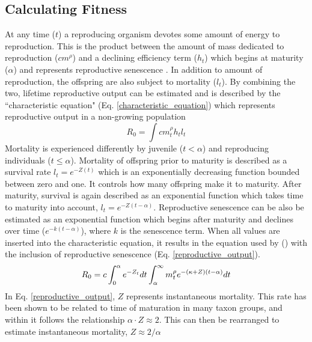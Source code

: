 \documentclass[a4paper, 11pt, hidelinks]{article} %
\begin{document}
	\subsection{Calculating Fitness}
	At any time ($ t $) a reproducing organism devotes some amount of energy to reproduction.  This is the product between the amount of mass dedicated to reproduction ($ cm^\rho $) and a declining efficiency term ($ h_t $) which begins at maturity ($ \alpha $) and represents reproductive senescence \parencite{Benoit2018, Vrtilek2018, Stearns2000}.  In addition to amount of reproduction, the offspring are also subject to mortality ($ l_t $).  By combining the two, lifetime reproductive output can be estimated and is described by the ``characteristic equation" (Eq. \ref{characteristic_equation}) which represents reproductive output in a non-growing population \parencite{Tsoukali2016, roff1993, Roff2001, stearns1992evolution, Arendt2011, Roff1986, Roff1984}
	\begin{equation}
		\label{characteristic_equation}
		R_0 = \int c m_t^\rho h_t l_t 
	\end{equation}
	Mortality is experienced differently by juvenile ($ t < \alpha $) and reproducing individuals ($ t \leq \alpha $). %
	Mortality of offspring prior to maturity is described as a survival rate $ l_t = e^{-Z(t)} $ which is an exponentially decreasing function bounded between zero and one.  It controls how many offspring make it to maturity.  After maturity, survival is again described as an exponential function which takes time to maturity into account, $ l_t = e^{-Z(t-\alpha)} $.  
	Reproductive senescence can be also be estimated as an exponential function which begins after maturity and declines over time  ($ e^{-k(t-\alpha)} $), where $ k $ is the senescence term.  When all values are inserted into the characteristic equation, it results in the equation used by \citeauthor{Charnov2001} (\citeyear{Charnov2001}) with the inclusion of reproductive senescence (Eq. \ref{reproductive_output}).
	\begin{equation}
		\label{reproductive_output}
		R_0 = c\int_0^\alpha e^{-Z_t} dt  \int_\alpha^\infty m_t^\rho e^{-(\kappa + Z)(t - \alpha)}dt\\
	\end{equation} 
	In Eq. \ref{reproductive_output}, $ Z $ represents instantaneous mortality.  This rate has been shown to be related to time of maturation in many taxon groups, and within it follows the relationship $ \alpha \cdot Z \approx  2$.  This can then be rearranged to estimate instantaneous mortality, $ Z \approx 2/\alpha  $
	
\end{document}
